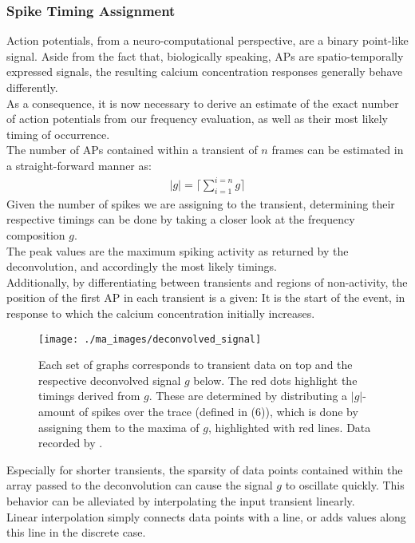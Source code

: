 \documentclass[titlepage]{article}
\begin{document}
\subsubsection{Spike Timing Assignment}\label{timing assignment}
Action potentials, from a neuro-computational perspective, are a binary point-like signal. Aside from the fact that, biologically speaking, APs are spatio-temporally expressed signals, the resulting calcium concentration responses generally behave differently.\\
As a consequence, it is now necessary to derive an estimate of the exact number of action potentials from our frequency evaluation, as well as their most likely timing of occurrence.\\
The number of APs contained within a transient of $n$ frames can be estimated in a straight-forward manner as:
\begin{align}
|g| = \lceil\sum_{i=1}^{i=n}g\rceil
\end{align}
Given the number of spikes we are assigning to the transient, determining their respective timings can be done by taking a closer look at the frequency composition $g$.\\
The peak values are the maximum spiking activity as returned by the deconvolution, and accordingly the most likely timings.\\
Additionally, by differentiating between transients and regions of non-activity, the position of the first AP in each transient is a given: It is the start of the event, in response to which the calcium concentration initially increases.
\begin{figure}[h]
\centering
\texttt{[image: ./ma\_images/deconvolved\_signal]}
\caption{Each set of graphs corresponds to transient data on top and the respective deconvolved signal $g$ below. The red dots highlight the timings derived from $g$. These are determined by distributing a $|g|$-amount of spikes over the trace (defined in (6)), which is done by assigning them to the maxima of $g$, highlighted with red lines. Data recorded by \citeauthor{akerboom_optimization_2012}\cite{akerboom_optimization_2012}.}
\label{fig:deconvolved_signal}
\end{figure}
Especially for shorter transients, the sparsity of data points contained within the array passed to the deconvolution can cause the signal $g$ to oscillate quickly. This behavior can be alleviated by interpolating the input transient linearly.\\
Linear interpolation simply connects data points with a line, or adds values along this line in the discrete case. 
\end{document}
